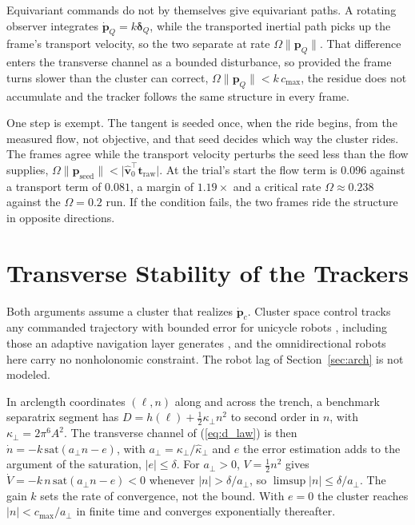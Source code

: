 \documentclass[lettersize,journal]{IEEEtran}
\begin{document}
Equivariant commands do not by themselves give equivariant paths. A
rotating observer integrates $\dot{\mathbf{p}}_Q = k\boldsymbol{\delta}_Q$,
while the transported inertial path picks up the frame's transport
velocity, so the two separate at rate $\Omega\lVert\mathbf{p}_Q\rVert$.
That difference enters the transverse channel as a bounded disturbance,
so provided the frame turns slower than the cluster can correct,
$\Omega\lVert\mathbf{p}_Q\rVert < k\,c_{\max}$, the residue does not
accumulate and the tracker follows the same structure in every frame.

One step is exempt. The tangent is seeded once, when the ride begins, from
the measured flow, not objective, and that seed decides which
way the cluster rides. The frames agree while the transport
velocity perturbs the seed less than the flow supplies,
$\Omega\lVert\mathbf{p}_{\text{seed}}\rVert <
\lvert\hat{\mathbf{v}}_0^\top\mathbf{t}_{\text{raw}}\rvert$.
At the trial's start the flow term is $0.096$ against a transport term
of $0.081$, a margin of $1.19\times$ and a critical rate
$\Omega \approx 0.238$ against the $\Omega = 0.2$ run. If the condition fails, the two frames ride the structure in opposite directions.

\section{Transverse Stability of the Trackers}
\label{app:stability}

Both arguments assume a cluster that realizes $\dot{\mathbf{p}}_c$.
Cluster space control tracks any commanded trajectory with bounded error
for unicycle robots \cite{37}, including those an adaptive navigation
layer generates \cite{2}, and the omnidirectional robots here carry no
nonholonomic constraint. The robot lag of Section~\ref{sec:arch} is not
modeled.

In arclength coordinates $(\ell, n)$ along and across the trench, a
benchmark separatrix segment has
$D = h(\ell) + \tfrac{1}{2}\kappa_\perp n^2$ to second order in $n$, with
$\kappa_\perp = 2\pi^6 A^2$. The transverse channel of (\ref{eq:d_law})
is then $\dot{n} = -k\,\mathrm{sat}(a_\perp n - e)$, with
$a_\perp = \kappa_\perp/\hat{\kappa}_\perp$ and $e$ the error estimation
adds to the argument of the saturation, $|e| \leq \delta$. For
$a_\perp > 0$, $V = \tfrac{1}{2}n^2$ gives
$\dot{V} = -k\,n\,\mathrm{sat}(a_\perp n - e) < 0$ whenever
$|n| > \delta/a_\perp$, so $\limsup |n| \leq \delta/a_\perp$. The gain $k$
sets the rate of convergence, not the bound. With $e = 0$ the cluster
reaches $|n| < c_{\max}/a_\perp$ in finite time and converges
exponentially thereafter.
\end{document}
